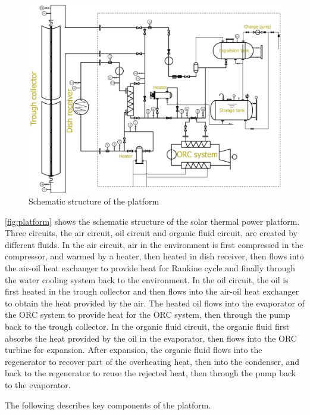 \begin{figure}[!ht]
\centering
\includegraphics[width=1.0\textwidth]{fig/platform.jpg}
\caption{Schematic structure of the platform}\label{fig:platform}
\end{figure}
\autoref{fig:platform} shows the schematic structure of the solar thermal power platform. 
Three circuits, the air circuit, oil circuit and organic fluid circuit, are created by different fluids. In the air circuit, air in the environment is first compressed in the compressor, and warmed by a heater, 
then heated in dish receiver, then flows into the air-oil heat exchanger to provide heat for Rankine cycle and finally through the water cooling system back to the environment. 
In the oil circuit, the oil is first heated in the trough collector and then flows into the air-oil heat exchanger to obtain the heat provided by the air. The heated oil flows 
into the evaporator of the ORC system to provide heat for the ORC system, then through the pump back to the trough collector.
In the organic fluid circuit, the organic fluid first absorbs the heat provided by the oil in the evaporator, then flows into the ORC turbine for expansion. After expansion, the organic fluid flows into the regenerator to recover part of the overheating heat, then into the condenser, and back to the regenerator to reuse the rejected heat, then through the pump back to the evaporator.

The following describes key components of the platform.

